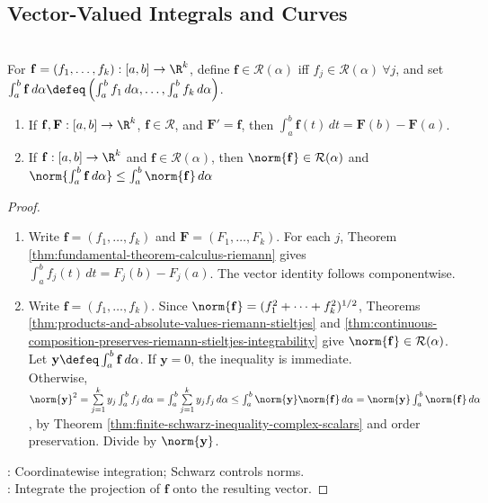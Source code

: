 \subsection{Vector-Valued Integrals and Curves}

\begin{definition} \label{def:vector-valued-riemann-stieltjes-integral} \\
For $\mathbf{f}=(f_1,\ldots,f_k):[a,b]\to\R^k$, define $\mathbf{f}\in\mathcal{R}(\alpha)$ iff $f_j\in\mathcal{R}(\alpha) \ \forall j$, and set $\int_a^b \mathbf{f}\,d\alpha \defeq \left(\int_a^b f_1\,d\alpha,\ldots,\int_a^b f_k\,d\alpha\right)$.
\end{definition}

\begin{theorem} \label{thm:vector-valued-integral-results} 
\begin{enumerate}[label=(\roman*)]
\setlength{\itemsep}{0pt}
\item If $\mathbf{f},\mathbf{F}:[a,b]\to\R^k$, $\mathbf{f}\in\mathcal{R}$, and $\mathbf{F}'=\mathbf{f}$, then $\int_a^b \mathbf{f}(t)\,dt=\mathbf{F}(b)-\mathbf{F}(a)$.
\item If $\mathbf{f}:[a,b]\to\R^k$ and $\mathbf{f}\in\mathcal{R}(\alpha)$, then $\norm{\mathbf{f}}\in\mathcal{R}(\alpha)$ and $\norm{\int_a^b \mathbf{f}\,d\alpha}\leq\int_a^b\norm{\mathbf{f}}\,d\alpha$
\end{enumerate}
\begin{proof}
\begin{enumerate}[label=(\roman*)]
\setlength{\itemsep}{0pt}
\item
Write $\mathbf{f}=(f_1,\ldots,f_k)$ and $\mathbf{F}=(F_1,\ldots,F_k)$. For each $j$, Theorem \ref{thm:fundamental-theorem-calculus-riemann} gives $\int_a^b f_j(t)\,dt=F_j(b)-F_j(a)$. The vector identity follows componentwise.
\item
Write $\mathbf{f}=(f_1,\ldots,f_k)$. Since $\norm{\mathbf{f}}=(f_1^2+\cdots+f_k^2)^{1/2}$, Theorems \ref{thm:products-and-absolute-values-riemann-stieltjes} and \ref{thm:continuous-composition-preserves-riemann-stieltjes-integrability} give $\norm{\mathbf{f}}\in\mathcal{R}(\alpha)$.\\
Let $\mathbf{y}\defeq\int_a^b\mathbf{f}\,d\alpha$. If $\mathbf{y}=0$, the inequality is immediate.\\
Otherwise, $\norm{\mathbf{y}}^2 =\sum\limits_{j=1}^{k}y_j\int_a^b f_j\,d\alpha =\int_a^b\sum\limits_{j=1}^{k}y_jf_j\,d\alpha \leq\int_a^b\norm{\mathbf{y}}\norm{\mathbf{f}}\,d\alpha =\norm{\mathbf{y}}\int_a^b\norm{\mathbf{f}}\,d\alpha$, by Theorem \ref{thm:finite-schwarz-inequality-complex-scalars} and order preservation. Divide by $\norm{\mathbf{y}}$.
\end{enumerate}
: Coordinatewise integration; Schwarz controls norms.\\
: Integrate the projection of $\mathbf{f}$ onto the resulting vector.
\end{proof}
\end{theorem}

